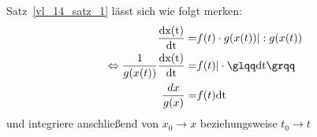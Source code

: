 \begin{Bemerkung}{
	Satz~\ref{vl_14_satz_1} lässt sich wie folgt merken:
	\begin{align*}
		\frac{\mathrm{dx(t)}}{\mathrm{dt}} = & f(t) \cdot g(x(t))
			\vert : g(x(t)) \\
		\Leftrightarrow 
		\frac{1}{g(x(t))} \frac{\mathrm{dx(t)}}{\mathrm{dt}} = & f(t)  \vert 
			\cdot \text{\glqq} \mathrm{dt}\text{\grqq} \\	
		\frac{dx}{g(x)} = &  f(t) \mathrm{dt}
	\end{align*}
	und integriere anschließend von $x_0 \rightarrow x$ beziehungsweise $t_0 
	\rightarrow t$
}\end{Bemerkung}
